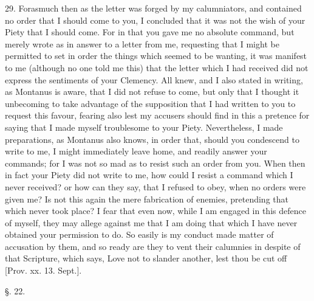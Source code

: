 29. Forasmuch then as the letter was forged by my calumniators, and
contained no order that I should come to you, I concluded that it was
not the wish of your Piety that I should come. For in that you gave me
no absolute command, but merely wrote as in answer to a letter from
me, requesting that I might be permitted to set in order the things
which seemed to be wanting, it was manifest to me (although no one
told me this) that the letter which I had received did not express the
sentiments of your Clemency. All knew, and I also stated in
writing, as Montanus is aware, that I did not refuse to come, but only
that I thought it unbecoming to take advantage of the supposition that
I had written to you to request this favour, fearing also lest my
accusers should find in this a pretence for saying that I made myself
troublesome to your Piety. Nevertheless, I made preparations, as
Montanus also knows, in order that, should you condescend to write to
me, I might immediately leave home, and readily answer your commands;
for I was not so mad as to resist such an order from you. When then in
fact your Piety did not write to me, how could I resist a command
which I never received? or how can they say, that I refused to obey,
when no orders were given me? Is not this again the mere fabrication
of enemies, pretending that which never took place? I fear that even
now, while I am engaged in this defence of myself, they may allege
against me that I am doing that which I have never obtained your
permission to do. So easily is my conduct made matter of accusation by
them, and so ready are they to vent their calumnies in despite of that
Scripture, which says, Love not to slander another, lest thou be cut
off [Prov. xx. 13. Sept.].

§. 22.

